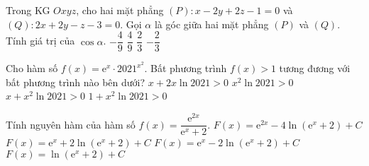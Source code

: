 \begin{ex}%
	Trong KG $Oxyz$, cho hai mặt phẳng $(P)\colon x-2y+2z-1=0$ và $(Q)\colon2x+2y-z-3=0$. Gọi $\alpha$ là góc giữa hai mặt phẳng $(P)$ và $(Q)$. Tính giá trị của $\cos\alpha$.
	\choice
	{$-\dfrac{4}{9}$}
	{\True $\dfrac{4}{9}$}
	{$\dfrac{2}{3}$}
	{$-\dfrac{2}{3}$}
\end{ex}
\begin{ex}%
	Cho hàm số $f(x)=\mathrm{e}^x\cdot2021^{x^2}$. Bất phương trình $f(x)>1$ tương đương với bất phương trình nào bên dưới?
	\choice
	{$x+2x\ln 2021>0$}
	{$x^2\ln 2021>0$}
	{\True $x+x^2\ln 2021>0$}
	{$1+x^2\ln 2021>0$}
\end{ex}
\begin{ex}%
	Tính nguyên hàm của hàm số $f(x)=\dfrac{\mathrm{e}^{2x}}{\mathrm{e}^x+2}$.
	\choice
	{$F(x)=\mathrm{e}^{2x}-4\ln \left(\mathrm{e}^x+2\right)+C$}
	{$F(x)=\mathrm{e}^x+2\ln \left(\mathrm{e}^x+2\right)+C$}
	{\True $F(x)=\mathrm{e}^x-2\ln \left(\mathrm{e}^x+2\right)+C$}
	{$F(x)=\ln \left(\mathrm{e}^x+2\right)+C$}
\end{ex}
